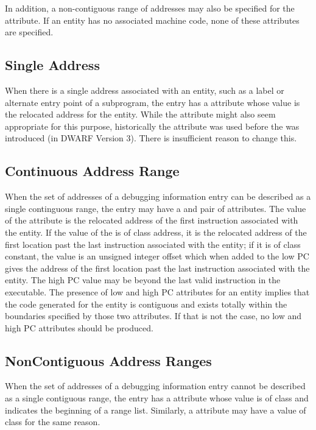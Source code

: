 In addition, a non-contiguous range of 
addresses may also be specified for the
 attribute.
If an entity has no associated machine code, 
none of these attributes are specified.

\subsection{Single Address} 
When there is a single address associated with an entity,
such as a label or alternate entry point of a subprogram,
the entry has a  attribute whose value is the
relocated address for the entity.  While the 
attribute might also seem appropriate for this purpose,
historically the  attribute was used before the
 was introduced (in DWARF Version 3). There is
insufficient reason to change this.

\subsection{Continuous Address Range}
\label{chap:contiguousaddressranges}
When the set of addresses of a debugging information entry can
be described as a single continguous range, the entry may have
a  and  pair of attributes. The value
of the  attribute is the relocated address of the
first instruction associated with the entity. If the value of
the  is of class address, it is the relocated
address of the first location past the last instruction
associated with the entity; if it is of class constant, the
value is an unsigned integer offset which when added to the
low PC gives the address of the first location past the last
instruction associated with the entity.  The high PC value
may be beyond the last valid instruction in the executable.
The presence of low and high PC attributes for an entity
implies that the code generated for the entity is contiguous
and exists totally within the boundaries specified by those
two attributes. If that is not the case, no low and high PC
attributes should be produced.

\subsection{Non\dash Contiguous Address Ranges}
\label{chap:noncontiguousaddressranges}
When the set of addresses of a debugging information entry
cannot be described as a single contiguous range, the entry has
a  attribute whose value is of class 
and indicates the beginning of a range list. Similarly,
a  attribute may have a value of class
 for the same reason.  

